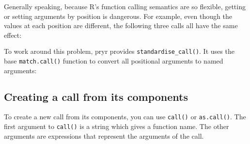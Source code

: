 Generally speaking, because R's function calling semantics are so
flexible, getting or setting arguments by position is dangerous. For
example, even though the values at each position are different, the
following three calls all have the same effect:

\begin{Shaded}
\begin{Highlighting}[]
\StringTok{ }\NormalTok{(}\NormalTok{(}\NormalTok{, } \NormalTok{))}
\StringTok{ }\NormalTok{(}\NormalTok{(} \NormalTok{, }\NormalTok{))}
\StringTok{ }\NormalTok{(}\NormalTok{(} \NormalTok{, , }\NormalTok{))}
\end{Highlighting}
\end{Shaded}

To work around this problem, pryr provides \texttt{standardise\_call()}.
It uses the base \texttt{match.call()} function to convert all
positional arguments to named arguments: 

\begin{Shaded}
\begin{Highlighting}[]
\end{Highlighting}
\end{Shaded}

\subsection{Creating a call from its components}

To create a new call from its components, you can use \texttt{call()} or
\texttt{as.call()}. The first argument to \texttt{call()} is a string
which gives a function name. The other arguments are expressions that
represent the arguments of the call.  

\begin{Shaded}
\begin{Highlighting}[]
\NormalTok{(}\NormalTok{, }\NormalTok{, }\NormalTok{)}
\NormalTok{(}\NormalTok{, }\NormalTok{(}\NormalTok{:}\NormalTok{), } \NormalTok{)}
\end{Highlighting}
\end{Shaded}

